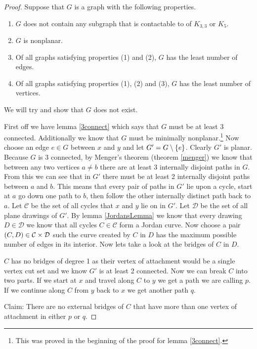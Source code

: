 \documentclass{article}
\begin{document}
\begin{proof}
	Suppose that $G$ is a graph with the following properties.
	\begin{enumerate}
		\item $G$ does not contain any subgraph that is contactable to of $K_{3,3}$ or $K_5$.
		\item $G$ is nonplanar.
		\item Of all graphs satisfying properties (1) and (2), $G$ has the least number of edges.
		\item Of all graphs satisfying properties (1), (2) and (3), $G$ has the least number of vertices.
	\end{enumerate}
	We will try and show that $G$ does not exist.

	First off we have lemma \ref{3connect} which says that $G$ must be at least 3 connected. Additionally we know that $G$ must be minimally nonplanar.\footnote{This was proved in the beginning of the proof for lemma \ref{3connect}.} Now choose an edge $e \in G$ between $x$ and $y$ and let $G' = G\setminus\left\{ {e} \right\}$. Clearly $G'$ is planar. Because $G$ is 3 connected, by Menger's theorem (theorem \ref{menger}) we know that between any two vertices $a\not=b$ there are at least 3 internally disjoint paths in $G$. From this we can see that in $G'$ there must be at least 2 internally disjoint paths between $a$ and $b$. This means that every pair of paths in $G'$ lie upon a cycle, start at $a$ go down one path to $b$, then follow the other internally distinct path back to $a$. Let $\mathcal C$ be the set of all cycles that $x$ and $y$ lie on in $G'$. Let $\mathcal D$ be the set of all plane drawings of $G'$. By lemma \ref{JordansLemma} we know that every drawing $D\in\mathcal D$ we know that all cycles $C\in\mathcal C$ form a Jordan curve. Now choose a pair $\left( {C} , {D} \right) \in \mathcal C\times\mathcal D$ such the curve created by $C$ in $D$ has the maximum possible number of edges in its interior. Now lets take a look at the bridges of $C$ in $D$.
	
	$C$ has no bridges of degree 1 as their vertex of attachment would be a single vertex cut set and we know $G'$ is at least 2 connected. Now we can break $C$ into two parts. If we start at $x$ and travel along $C$ to $y$ we get a path we are calling $p$. If we continue along $C$ from $y$ back to $x$ we get another path $q$.
	
	Claim: There are no external bridges of $C$ that have more than one vertex of attachment in either $p$ or $q$.
	

\end{proof}
\end{document}

